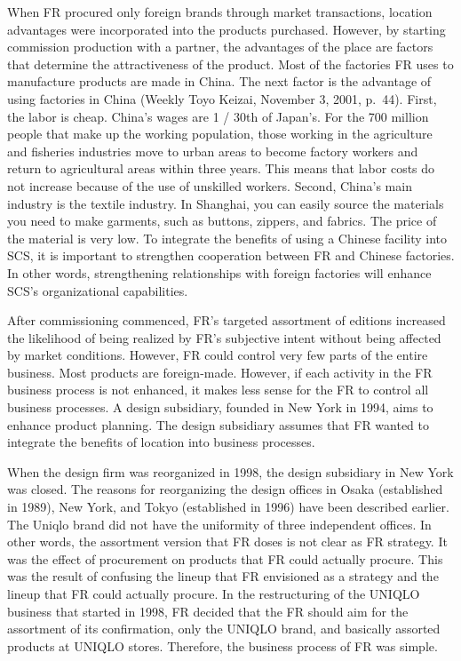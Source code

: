 \documentclass[12pt,]{article}
\begin{document}
When FR procured only foreign brands through market transactions,
location advantages were incorporated into the products purchased.
However, by starting commission production with a partner, the
advantages of the place are factors that determine the attractiveness of
the product. Most of the factories FR uses to manufacture products are
made in China. The next factor is the advantage of using factories in
China (Weekly Toyo Keizai, November 3, 2001, p.~44). First, the labor is
cheap. China's wages are 1 / 30th of Japan's. For the 700 million people
that make up the working population, those working in the agriculture
and fisheries industries move to urban areas to become factory workers
and return to agricultural areas within three years. This means that
labor costs do not increase because of the use of unskilled workers.
Second, China's main industry is the textile industry. In Shanghai, you
can easily source the materials you need to make garments, such as
buttons, zippers, and fabrics. The price of the material is very low. To
integrate the benefits of using a Chinese facility into SCS, it is
important to strengthen cooperation between FR and Chinese factories. In
other words, strengthening relationships with foreign factories will
enhance SCS's organizational capabilities.

After commissioning commenced, FR's targeted assortment of editions
increased the likelihood of being realized by FR's subjective intent
without being affected by market conditions. However, FR could control
very few parts of the entire business. Most products are foreign-made.
However, if each activity in the FR business process is not enhanced, it
makes less sense for the FR to control all business processes. A design
subsidiary, founded in New York in 1994, aims to enhance product
planning. The design subsidiary assumes that FR wanted to integrate the
benefits of location into business processes.

When the design firm was reorganized in 1998, the design subsidiary in
New York was closed. The reasons for reorganizing the design offices in
Osaka (established in 1989), New York, and Tokyo (established in 1996)
have been described earlier. The Uniqlo brand did not have the
uniformity of three independent offices. In other words, the assortment
version that FR doses is not clear as FR strategy. It was the effect of
procurement on products that FR could actually procure. This was the
result of confusing the lineup that FR envisioned as a strategy and the
lineup that FR could actually procure. In the restructuring of the
UNIQLO business that started in 1998, FR decided that the FR should aim
for the assortment of its confirmation, only the UNIQLO brand, and
basically assorted products at UNIQLO stores. Therefore, the business
process of FR was simple.
\end{document}
